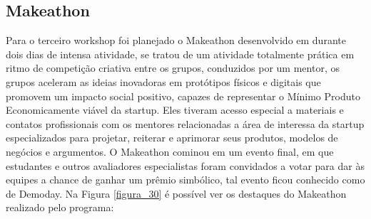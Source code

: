 \subsection{Makeathon}

Para o terceiro workshop foi planejado o Makeathon desenvolvido em durante dois dias de intensa atividade, se tratou de um atividade totalmente prática em ritmo de competição criativa entre os grupos, conduzidos por um mentor, os grupos aceleram as ideias inovadoras em protótipos físicos e digitais que promovem um impacto social positivo, capazes de representar o Mínimo Produto Economicamente viável da startup.
Eles tiveram acesso especial a materiais e contatos profissionais com os mentores relacionadas a área de interessa da startup especializados para projetar, reiterar e aprimorar seus produtos, modelos de negócios e argumentos. O Makeathon cominou em um evento final, em que estudantes e outros avaliadores especialistas foram convidados a votar para dar às equipes a chance de ganhar um prêmio simbólico, tal evento ficou conhecido como de Demoday. Na Figura \ref{figura_30} é possível ver os destaques do Makeathon realizado pelo programa:

